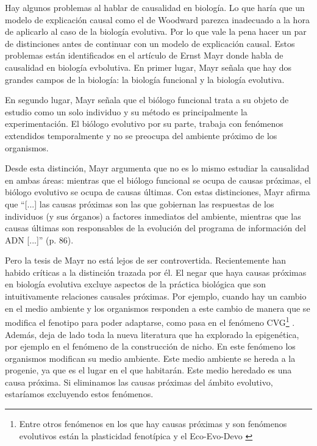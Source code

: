 Hay algunos problemas al hablar de causalidad en biología. Lo que haría que un modelo de explicación causal como el de Woodward parezca inadecuado a la hora de aplicarlo al caso de la biología evolutiva. Por lo que vale la pena hacer un par de distinciones antes de continuar con un modelo de explicación causal. Estos problemas están identificados en el artículo de Ernst Mayr \citeyear{Mayr1998} donde habla de causalidad en biología evbolutiva. En primer lugar, Mayr señala que hay dos grandes campos de la biología: la biología funcional y la biología evolutiva.

En segundo lugar, Mayr señala que el biólogo funcional trata a su objeto de estudio como un solo individuo y su método es principalmente la experimentación. El biólogo evolutivo por su parte, trabaja con fenómenos extendidos temporalmente y no se preocupa del ambiente próximo de los organismos.

Desde esta distinción, Mayr argumenta que no es lo mismo estudiar la causalidad en ambas áreas: mientras que el biólogo funcional se ocupa de causas próximas, el biólogo evolutivo se ocupa de causas últimas. Con estas distinciones, Mayr afirma que ``[...] las causas próximas son las que gobiernan las respuestas de los individuos (y sus órganos) a factores inmediatos del ambiente, mientras que las causas últimas son responsables de la evolución del programa de información del ADN [...]'' (p. 86).


Pero la tesis de Mayr no está lejos de ser controvertida. Recientemente han habido críticas a la distinción trazada por él. El negar que haya causas próximas en biología evolutiva excluye aspectos de la práctica biológica que son intuitivamente relaciones causales próximas. Por ejemplo, cuando hay un cambio en el medio ambiente y los organismos responden a este cambio de manera que se modifica el fenotipo para poder adaptarse, como pasa en el fenómeno CVG\footnote{Entre otros fenómenos en los que hay causas próximas y son fenómenos evolutivos están la plasticidad fenotípica \cite{WESTEBERHARD20082701} y el Eco-Evo-Devo \cite{PfenningEco-Evo-Devo}} \cite{CVG}. Además, deja de lado toda la nueva literatura que ha explorado la epigenética, por ejemplo en el fenómeno de la construcción de nicho. En este fenómeno los organismos modifican su medio ambiente. Este medio ambiente se hereda a la progenie, ya que es el lugar en el que habitarán. Este medio heredado es una causa próxima. Si eliminamos las causas próximas del ámbito evolutivo, estaríamos excluyendo estos fenómenos.

